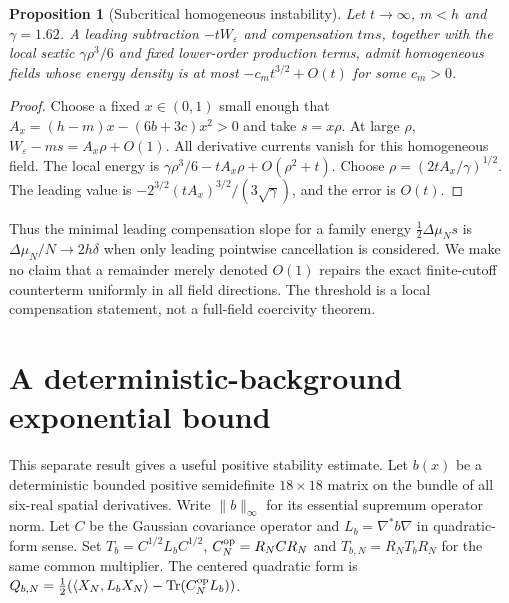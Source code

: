 \documentclass[11pt]{article}
\newtheorem{proposition}[theorem]{Proposition}
\newcommand{\tr}{\operatorname{Tr}}
\newcommand{\eps}{\varepsilon}
\newcommand{\la}[1]{\langle #1\rangle}
\begin{document}
\begin{proposition}[Subcritical homogeneous instability]\label{prop:instability}
Let $t\to\infty$, $m<h$ and $\gamma=1.62$. A leading subtraction
$-tW_\eps$ and compensation $tms$, together with the local sextic
$\gamma\rho^3/6$ and fixed lower-order production terms, admit homogeneous
fields whose energy density is at most $-c_m t^{3/2}+O(t)$ for some $c_m>0$.
\end{proposition}
\begin{proof}
Choose a fixed $x\in(0,1)$ small enough that
$A_x=(h-m)x-(6b+3c)x^2>0$ and take $s=x\rho$.
At large $\rho$, $W_\eps-ms=A_x\rho+O(1)$.
All derivative currents vanish for this homogeneous field. The local
energy is $\gamma\rho^3/6-tA_x\rho+O(\rho^2+t)$.
Choose $\rho=(2tA_x/\gamma)^{1/2}$. The leading value is
$-2^{3/2}(tA_x)^{3/2}/(3\sqrt\gamma)$, and the error is $O(t)$.
\end{proof}

Thus the minimal leading compensation slope for a family energy
$\tfrac12\Delta\mu_Ns$ is $\Delta\mu_N/N\to2h\delta$
when only leading pointwise cancellation is considered. We make no claim
that a remainder merely denoted $O(1)$ repairs the exact finite-cutoff
counterterm uniformly in all field directions. The threshold is a local
compensation statement, not a full-field coercivity theorem.

\section{A deterministic-background exponential bound}
This separate result gives a useful positive stability estimate. Let $b(x)$
be a deterministic bounded positive semidefinite $18\times18$ matrix on the
bundle of all six-real spatial derivatives. Write $\|b\|_\infty$ for its
essential supremum operator norm. Let $C$ be the Gaussian covariance operator
and $L_b=\nabla^*b\nabla$ in quadratic-form sense. Set
$T_b=C^{1/2}L_bC^{1/2}$, $C_N^{\rm op}=R_NCR_N$ and
$T_{b,N}=R_NT_bR_N$ for the same common multiplier.
The centered quadratic form is $Q_{b,N}=\tfrac12(\la{X_N,L_bX_N}
-\tr(C_N^{\rm op}L_b))$.
\end{document}
